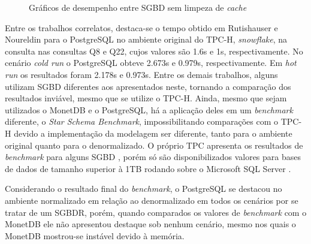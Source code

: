 \begin{figure}[htpb]
        \centering
        \caption{Gráficos de desempenho entre SGBD sem limpeza de \textit{cache}}
        \label{fig:qph_sgbd_cache_2}
\end{figure}

Entre os trabalhos correlatos, destaca-se o tempo obtido em Rutishauser e Noureldin \cite{rutishauser2012tpc} para o PostgreSQL no ambiente original do TPC-H, \textit{snowflake}, na consulta nas consultas Q8 e Q22, cujos valores são 1.6s e 1s, respectivamente. No cenário \textit{cold run} o PostgreSQL obteve 2.673s e 0.979s, respectivamente. Em \textit{hot run} os resultados foram 2.178s e 0.973s. Entre os demais trabalhos, alguns utilizam SGBD diferentes aos apresentados neste, tornando a comparação dos resultados inviável, mesmo que se utilize o TPC-H. Ainda, mesmo que sejam utilizados o MonetDB e o PostgreSQL, há a aplicação deles em um \textit{benchmark} diferente, o \textit{Star Schema Benchmark}, impossibilitando comparações com o TPC-H devido a implementação da modelagem ser diferente, tanto para o ambiente original quanto para o denormalizado. O próprio TPC apresenta os resultados de \textit{benchmark} para alguns SGBD \cite{tpc2018resultados}, porém só são disponibilizados valores para bases de dados de tamanho superior à 1TB rodando sobre o Microsoft SQL Server \cite{microsoft2018r}.

Considerando o resultado final do \textit{benchmark}, o PostgreSQL se destacou no ambiente normalizado em relação ao denormalizado em todos os cenários por se tratar de um SGBDR, porém, quando comparados os valores de \textit{benchmark} com o MonetDB ele não apresentou destaque sob nenhum cenário, mesmo nos quais o MonetDB mostrou-se instável devido à memória. 

